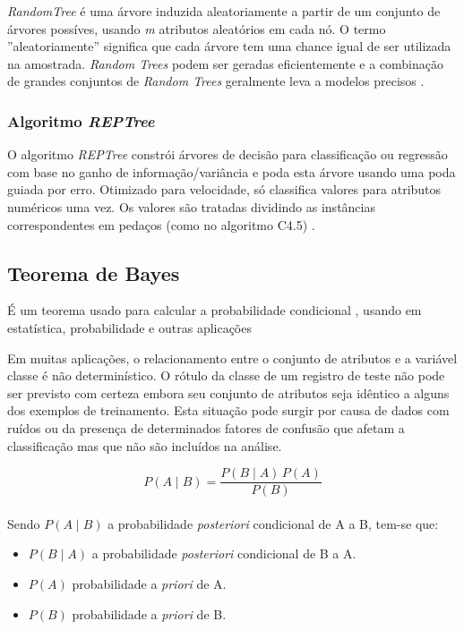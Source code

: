 \documentclass[
	12pt,				%
	openright,			%
	oneside,	
	a4paper,				%
	english,				%
	brazil				%
]{abntex2/abntex2} %
\begin{document}
	\textit{RandomTree} é uma árvore induzida aleatoriamente a partir de um conjunto de árvores possíves, usando \textit{m} atributos aleatórios em cada nó. O termo ''aleatoriamente'' significa que cada árvore tem uma chance igual de ser utilizada na amostrada. \textit{Random Trees} podem ser geradas eficientemente e a combinação de grandes conjuntos de \textit{Random Trees} geralmente leva a modelos precisos \cite{zhao:2008}.
	
	\subsubsection{Algoritmo \textit{REPTree}}
	
	O algoritmo \textit{REPTree} constrói árvores de decisão para classificação ou regressão  com base no ganho de informação/variância e poda esta árvore usando uma poda guiada por erro. Otimizado para velocidade, só classifica valores para atributos numéricos uma vez. Os valores são tratadas dividindo as instâncias correspondentes em pedaços (como no algoritmo C4.5) \cite{witten:2011}.
			
	\subsection{Teorema de Bayes}
	
	É um teorema usado para calcular a probabilidade condicional , usando em estatística, probabilidade e outras aplicações
	
	Em muitas aplicações, o relacionamento entre o conjunto de atributos e a variável classe é não determinístico. O rótulo da classe de um registro de teste não pode ser previsto com certeza embora seu conjunto de atributos seja idêntico a alguns dos exemplos de treinamento. Esta situação pode surgir por causa de dados com ruídos ou da presença de determinados fatores de confusão que afetam a classificação mas que não são incluídos na análise.
	
	\begin{equation}
		 P(A \mid B) = \frac{P(B \mid A) \, P(A)}{P(B)} 
	\end{equation}
	\\
	Sendo $ P(A\mid B) $ a probabilidade \textit{posteriori} condicional de A a B, tem-se que:
	\begin{itemize}
		\item $P(B \mid A) $ a probabilidade \textit{posteriori} condicional de B a A.
		\item $P(A)$ probabilidade a \textit{priori} de A.
		\item $P(B )$ probabilidade a \textit{priori} de B.
	\end{itemize}
	
\end{document}
